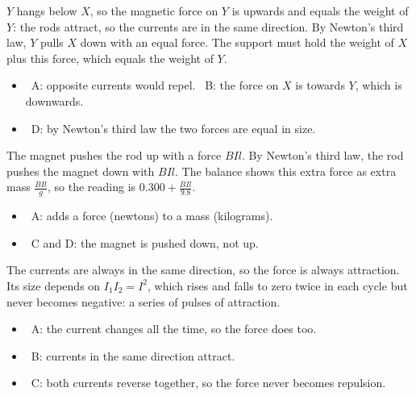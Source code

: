 \documentclass[12pt]{article}
\begin{document}
\begin{practiceanswers}
\begin{practiceans}
  $Y$ hangs below $X$, so the magnetic force on $Y$ is upwards and equals the weight of $Y$: the rods
  attract, so the currents are in the same direction. By Newton's third law, $Y$ pulls $X$ down with an
  equal force. The support must hold the weight of $X$ plus this force, which equals the weight of $Y$.
  \begin{itemize}
    \item \xmark\ A: opposite currents would repel. \quad \xmark\ B: the force on $X$ is towards $Y$,
          which is downwards.
    \item \xmark\ D: by Newton's third law the two forces are equal in size.
  \end{itemize}
\end{practiceans}

\begin{practiceans}
  The magnet pushes the rod up with a force $BIl$. By Newton's third law, the rod pushes the magnet down
  with $BIl$. The balance shows this extra force as extra mass $\frac{BIl}{g}$, so the reading is
  $0.300 + \frac{BIl}{9.8}$.
  \begin{itemize}
    \item \xmark\ A: adds a force (newtons) to a mass (kilograms).
    \item \xmark\ C and D: the magnet is pushed down, not up.
  \end{itemize}
\end{practiceans}

\begin{practiceans}
  The currents are always in the same direction, so the force is always attraction. Its size depends on
  $I_1 I_2 = I^2$, which rises and falls to zero twice in each cycle but never becomes negative: a series
  of pulses of attraction.
  \begin{itemize}
    \item \xmark\ A: the current changes all the time, so the force does too.
    \item \xmark\ B: currents in the same direction attract.
    \item \xmark\ C: both currents reverse together, so the force never becomes repulsion.
  \end{itemize}
\end{practiceans}


\end{practiceanswers}
\end{document}
